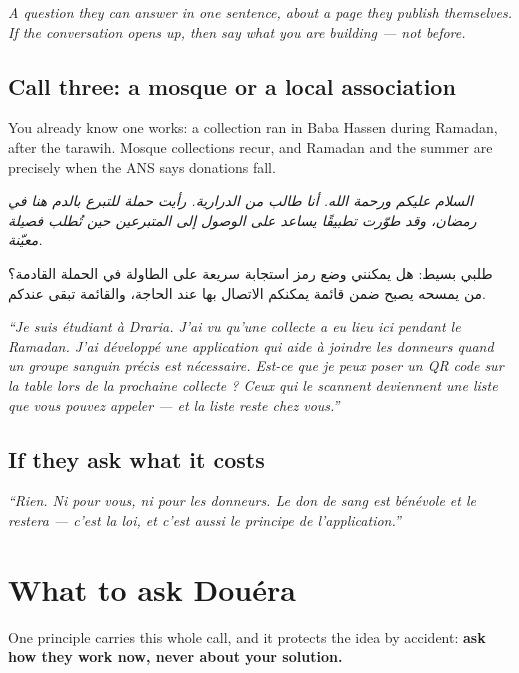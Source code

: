\documentclass[11pt,a4paper]{article}
\newcommand{\ar}[1]{{\upshape\textarabic{#1}}}
\newcommand{\note}[1]{{\small\color{qatraGrey}\textit{#1}}}
\newenvironment{say}
  {\par\medskip\noindent\begin{lrbox}{\saybox}%
   \begin{minipage}{\dimexpr\textwidth-2\fboxsep-2pt}\itshape\vspace{4pt}}
  {\vspace{4pt}\end{minipage}\end{lrbox}%
   \fcolorbox{rule}{sayBg}{\usebox{\saybox}}\par\medskip}
\begin{document}
\note{A question they can answer in one sentence, about a page they publish
themselves. If the conversation opens up, then say what you are building --- not
before.}

\subsection{Call three: a mosque or a local association}

You already know one works: a collection ran in Baba Hassen during Ramadan,
after the tarawih. Mosque collections recur, and Ramadan and the summer are
precisely when the ANS says donations fall.

\begin{say}
\ar{السلام عليكم ورحمة الله. أنا طالب من الدرارية. رأيت حملة للتبرع بالدم هنا في رمضان، وقد طوّرت تطبيقًا يساعد على الوصول إلى المتبرعين حين تُطلب فصيلة معيّنة.}

\ar{طلبي بسيط: هل يمكنني وضع رمز استجابة سريعة على الطاولة في الحملة القادمة؟ من يمسحه يصبح ضمن قائمة يمكنكم الاتصال بها عند الحاجة، والقائمة تبقى عندكم.}
\end{say}

\begin{say}
``Je suis \'etudiant \`a Draria. J'ai vu qu'une collecte a eu lieu ici pendant le
Ramadan. J'ai d\'evelopp\'e une application qui aide \`a joindre les donneurs quand
un groupe sanguin pr\'ecis est n\'ecessaire. Est-ce que je peux poser un QR code
sur la table lors de la prochaine collecte ? Ceux qui le scannent deviennent une
liste que vous pouvez appeler --- et la liste reste chez vous.''
\end{say}

\subsection{If they ask what it costs}

\begin{say}
``Rien. Ni pour vous, ni pour les donneurs. Le don de sang est b\'en\'evole et le
restera --- c'est la loi, et c'est aussi le principe de l'application.''
\end{say}

\section{What to ask Dou\'era}

One principle carries this whole call, and it protects the idea by accident:
\textbf{ask how they work now, never about your solution.}
\end{document}
